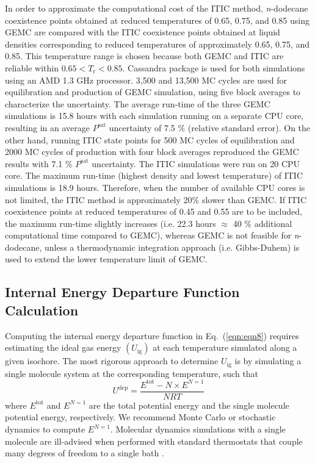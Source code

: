 \documentclass[5p,times]{elsarticle}
\begin{document}
In order to approximate the computational cost of the ITIC method, \textit{n}-dodecane  coexistence points obtained at reduced temperatures of 0.65, 0.75, and 0.85 using  GEMC are compared with the ITIC coexistence points obtained at liquid densities corresponding to reduced temperatures of approximately 0.65, 0.75, and 0.85. This temperature range is chosen because both  GEMC and ITIC are reliable within $0.65<T_\mathrm{r}<0.85$. Cassandra package is used for both simulations using an AMD 1.3 GHz processor. 3,500 and 13,500 MC cycles are used for equilibration and production of GEMC simulation, using five block averages to characterize the uncertainty. The average run-time of the three GEMC simulations is 15.8 hours with each simulation running on a separate CPU core, resulting in an average $P^\mathrm{sat}$ uncertainty of 7.5 \% (relative standard error). On the other hand, running ITIC state points for 500 MC cycles of equilibration and 2000 MC cycles of production with four block averages reproduced the GEMC results with 7.1 \% $P^\mathrm{sat}$ uncertainty. The ITIC simulations were run on 20 CPU core. The maximum run-time (highest density and lowest temperature) of ITIC simulations is 18.9 hours. Therefore, when the number of available CPU cores is not limited, the ITIC method is approximately 20\% slower than GEMC. If ITIC coexistence points at reduced temperatures of 0.45 and 0.55 are to be included, the maximum run-time slightly increases (i.e. 22.3 hours $\approx$ 40 \% additional computational time compared to GEMC), whereas GEMC is not feasible for \textit{n}-dodecane, unless a thermodynamic integration approach (i.e. Gibbs-Duhem) is used to extend the lower temperature limit of GEMC.


\subsection{Internal Energy Departure Function Calculation}\label{sec:udepCalc}

Computing the internal energy departure function in Eq.~(\ref{eqn:eqn8}) requires estimating the ideal gas energy $(U_{\mathrm{ig}})$ at each temperature simulated along a given isochore. The most rigorous approach to determine $U_{\mathrm{ig}}$ is by simulating a single molecule system at the corresponding temperature, such that
\begin{equation}\label{eqn:uDep single molecule}
U^{\mathrm{dep}} = \frac{E^{\mathrm{tot}} - N \times E^{N=1}}{NRT}
\end{equation}
where $E^{\mathrm{tot}}$ and $E^{N=1}$ are the total potential energy and the single molecule potential energy, respectively. We recommend Monte Carlo or stochastic dynamics to compute $E^{N=1}$. Molecular dynamics simulations with a single molecule are ill-advised when performed with standard thermostats that couple many degrees of freedom to a single bath \cite{Merz2018}. 
\end{document}
